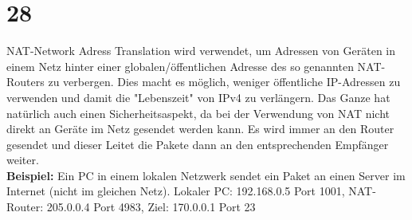 \documentclass[12pt, a4paper]{article}
\begin{document}
	
	
	\newpage
	\section*{28}
	NAT-Network Adress Translation wird verwendet, um Adressen von Geräten in einem Netz hinter einer globalen/öffentlichen Adresse des so genannten NAT-Routers zu verbergen. Dies macht es möglich, weniger öffentliche IP-Adressen zu verwenden und damit die "Lebenszeit" von IPv4 zu verlängern. Das Ganze hat natürlich auch einen Sicherheitsaspekt, da bei der Verwendung von NAT nicht direkt an Geräte im Netz gesendet werden kann. Es wird immer an den Router gesendet und dieser Leitet die Pakete dann an den entsprechenden Empfänger weiter.\\
	\textbf{Beispiel:}
	Ein PC in einem lokalen Netzwerk sendet ein Paket an einen Server im Internet (nicht im gleichen Netz).
	Lokaler PC: 192.168.0.5 Port 1001, NAT-Router: 205.0.0.4 Port 4983, Ziel: 170.0.0.1 Port 23
\end{document}

